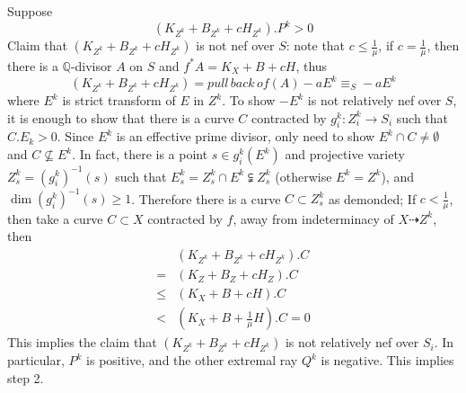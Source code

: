 \documentclass{article}
\begin{document}
\begin{enumerate}[Step 1]
  Suppose
  \[ (K_{Z^k}+B_{Z^k}+cH_{Z^k}).P^k>0 \]
  Claim that $ (K_{Z^k}+B_{Z^k}+cH_{Z^k}) $ is not nef over $ S $: note that $ c\leqslant \frac{1}{\mu} $, if $ c=\frac{1}{\mu} $, then there is a $ \mathbb{Q} $-divisor $ A $ on $ S $ and $ f^*A=K_X+B+cH $, thus 
  \[ (K_{Z^k}+B_{Z^k}+cH_{Z^k})=pull\,back\,of (A)-aE^k\equiv_S -aE^k \]
  where $ E^k $ is strict transform of $ E $ in $ Z^k $. To show $ -E^k $ is not relatively nef over $ S $, it is enough to show that there is a curve $ C $ contracted by $ g_i^k:Z^k_i\to S_i $ such that $ C.E_k>0 $.  Since $ E^k $ is an effective prime divisor, only need to show $ E^k\cap C\neq \emptyset $ and $ C\nsubseteq E^k $. In fact, there is a point $ s\in g_i^k(E^k) $ and projective variety $ Z^k_s=(g_i^k)^{-1}(s) $ such that $ E^k_s=Z^k_s\cap E^k\subsetneqq Z^k_s $ (otherwise $ E^k=Z^k $), and $ \dim (g_i^k)^{-1}(s)\geqslant 1 $. Therefore there is a curve $ C\subset Z^k_s $ as demonded; If $ c<\frac{1}{\mu} $, then take a curve $ C\subset X $ contracted by $ f $, away from indeterminacy of $ X\dashrightarrow Z^k $, then
  \[
    \begin{aligned}
      &(K_{Z^k}+B_{Z^k}+cH_{Z^k}).C\\
      =&   (K_{Z}+B_{Z}+cH_{Z}).C\\
      \leqslant& (K_{X}+B+cH).C\\
      <&(K_X+B+\frac{1}{\mu}H).C=0
    \end{aligned}
  \]
  This implies the claim that $ (K_{Z^k}+B_{Z^k}+cH_{Z^k}) $ is not relatively nef over $ S_i $. In particular,  $ P^k $ is positive, and the other extremal ray $ Q^k $ is negative. This implies step 2. 
  

\end{enumerate}
\end{document}
